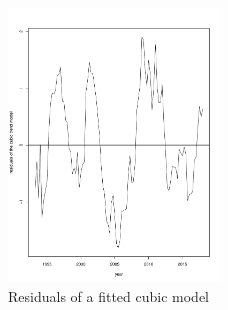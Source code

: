 \documentclass[11pt,a4paper]{article}
\begin{document}
\begin{figure}[!htb]
\centering
\includegraphics[angle=0,
width=0.5\textwidth]{resid_cubicmodel}
\caption{Residuals of a fitted cubic model
\label{fig:resid_cubicmodel}}
\end{figure}
\end{document}
